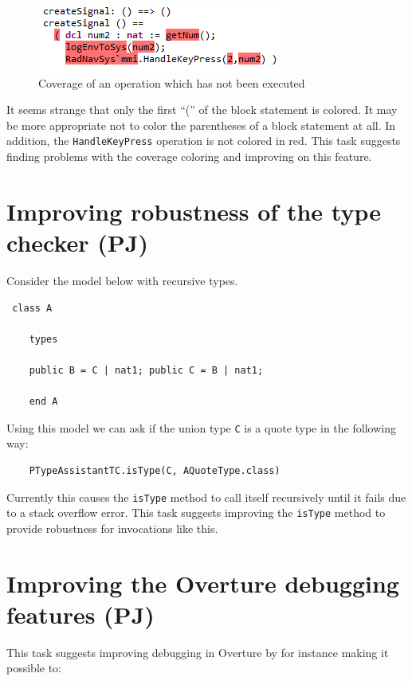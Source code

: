\documentclass[11pt]{overturerep} \usepackage{t1enc,times,a4,t1enc}
\begin{document}
\begin{figure}[!ht] \centering \includegraphics{figures/coverage}
    \caption{Coverage of an operation which has not been
    executed}\label{figure:Coverage} 
\end{figure}

It seems strange that only the first ``('' of the block statement is colored.
It may be more appropriate not to color the parentheses of a block statement at
all. In addition, the \texttt{HandleKeyPress} operation is not colored in red.
This task suggests finding problems with the coverage coloring and improving on
this feature.

\section{Improving robustness of the type checker (PJ)}

Consider the model below with recursive types.

\begin{lstlisting} class A

    types

    public B = C | nat1; public C = B | nat1; 

    end A 
\end{lstlisting}

Using this model we can ask if the union type \texttt{C} is a quote type in the
following way:

\begin{lstlisting} 
    PTypeAssistantTC.isType(C, AQuoteType.class)
\end{lstlisting}

Currently this causes the \texttt{isType} method to call itself recursively
until it fails due to a stack overflow error. This task suggests improving the
\texttt{isType} method to provide robustness for invocations like this.

\section{Improving the Overture debugging features (PJ)}

This task suggests improving debugging in Overture by for instance making it
possible to:
\end{document}
